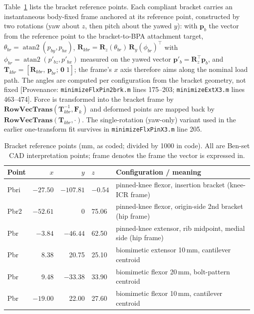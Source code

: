 Table~\ref{tab:app_bracket_points} lists the bracket reference points. Each compliant bracket carries an instantaneous body-fixed frame anchored at its reference point, constructed by two rotations (yaw about $z$, then pitch about the yawed $y$): with $\mathbf{p}_{b}$ the vector from the reference point to the bracket-to-BPA attachment target, $\theta_{br} = \operatorname{atan2}(p_{by}, p_{bx})$, $\mathbf{R}_{kbr} = \mathbf{R}_{z}(\theta_{br})\,\mathbf{R}_{y}(\phi_{br})^{\top}$ with $\phi_{br} = \operatorname{atan2}(p'_{bz}, p'_{bx})$ measured on the yawed vector $\mathbf{p}'_{b} = \mathbf{R}_{z}^{\top}\mathbf{p}_{b}$, and $\mathbf{T}_{kbr} = [\mathbf{R}_{kbr},\, \mathbf{p}_{br};\, \mathbf{0}\;1]$; the frame's $x$ axis therefore aims along the nominal load path. The angles are computed per configuration from the bracket geometry, not fixed [Provenance: \texttt{minimizeFlxPin2brk.m} lines 175--203; \texttt{minimizeExtX3.m} lines 463--474]. Force is transformed into the bracket frame by $\mathbf{RowVecTrans}(\mathbf{T}_{kbr}^{-1}, \mathbf{F}_{k})$ and deformed points are mapped back by $\mathbf{RowVecTrans}(\mathbf{T}_{kbr}, \cdot)$. The single-rotation (yaw-only) variant used in the earlier one-transform fit survives in \texttt{minimizeFlxPinX3.m} line 205.

\begin{table}[htbp]
\caption{Bracket reference points (mm, as coded; divided by 1000 in code). All are Ben-set CAD interpretation points; frame denotes the frame the vector is expressed in.}
\label{tab:app_bracket_points}
\begin{tabular}{@{}lrrll@{}}
\toprule
\textbf{Point} & $x$ & $y$ & $z$ & \textbf{Configuration / meaning} \\
\midrule
Pbri & $-27.50$ & $-107.81$ & $-0.54$ & pinned-knee flexor, insertion bracket (knee-ICR frame) \\
Pbr2 & $-52.61$ & 0 & 75.06 & pinned-knee flexor, origin-side 2nd bracket (hip frame) \\
Pbr  & $-3.84$  & $-46.44$ & 62.50 & pinned-knee extensor, rib midpoint, medial side (hip frame) \\
Pbr  & 8.38 & 20.75 & 25.10 & biomimetic extensor 10\,mm, cantilever centroid \\
Pbr  & 9.48 & $-33.38$ & 33.90 & biomimetic flexor 20\,mm, bolt-pattern centroid \\
Pbr  & $-19.00$ & 22.00 & 27.60 & biomimetic flexor 10\,mm, cantilever centroid \\
\bottomrule
\end{tabular}
\end{table}

